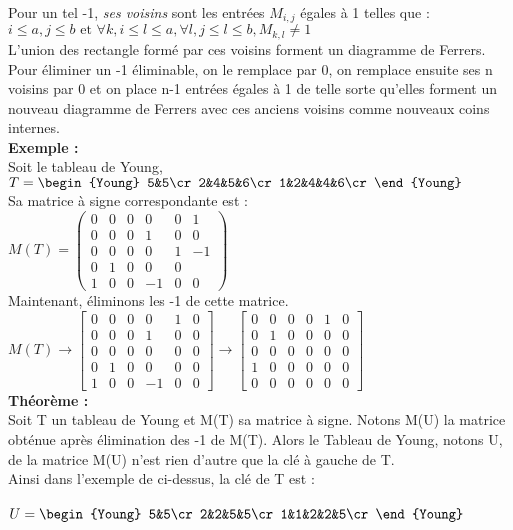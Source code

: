 \documentclass{book}
\begin{document}
Pour un tel -1, \textit{ses voisins} sont les entrées $M_{i,j}$ égales à 1 telles que : \\
$i  \leq a, j \leq b \mbox{ et } \forall k, i\leq l \leq a, \forall l, j \leq l \leq b, M_{k,l} \ne 1$\\

L'union des rectangle formé par ces voisins forment un diagramme de Ferrers.\\

Pour éliminer un -1 éliminable, on le remplace par 0, on remplace ensuite ses n voisins par 0 et on place n-1 entrées égales à 1 de telle sorte qu'elles forment un nouveau diagramme de Ferrers avec ces anciens voisins comme nouveaux coins internes. \\

\textbf{Exemple : }\\
Soit le tableau de Young, 
$ T = 
\begin{Young}
5&5\cr
2&4&5&6\cr
1&2&4&4&6\cr
\end{Young}  
  $\\
Sa matrice à signe correspondante est : \\

$M(T) = \begin{pmatrix}
0&0&0&0&0&1\\0&0&0&1&0&0\\0&0&0&0&1&-1\\0&1&0&0&0\\1&0&0&-1&0&0
\end{pmatrix}$   \\

Maintenant, éliminons les -1 de cette matrice.\\

$M(T) \rightarrow \begin{bmatrix}
0&0&0&0&1&0\\0&0&0&1&0&0\\0&0&0&0&0&0\\0&1&0&0&0&0\\1&0&0&-1&0&0
\end{bmatrix}
  \rightarrow \begin{bmatrix}
0&0&0&0&1&0\\0&1&0&0&0&0\\0&0&0&0&0&0\\1&0&0&0&0&0\\0&0&0&0&0&0
\end{bmatrix}
 $\\

\textbf{Théorème : } \\
Soit T un tableau de Young et M(T) sa matrice à signe. Notons M(U) la matrice obténue après élimination des -1 de M(T). Alors le Tableau de Young, notons U, de la matrice M(U) n'est rien d'autre que la clé à gauche de T. \\
Ainsi dans l'exemple de ci-dessus, la clé de T est :\\\\
$ U = 
\begin{Young}
5&5\cr
2&2&5&5\cr
1&1&2&2&5\cr
\end{Young}  
  $\\
\end{document}
